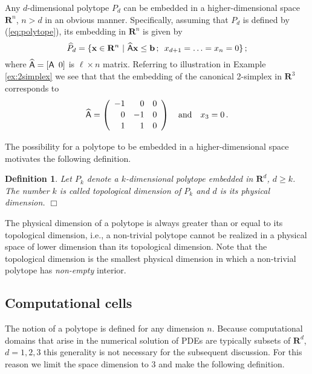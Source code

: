 \documentclass[pdf,12pt,relaxed]{SANDreport}
\newtheorem{defin}{Definition}
\begin{document}
       
     Any $d$-dimensional polytope $P_d$ can be embedded in a higher-dimensional space $\mathbf{R}^n$, $n>d$ in an obvious manner. Specifically, assuming that $P_d$ is defined by (\ref{eq:polytope}), its embedding in $\mathbf{R}^n$ is given by
    \begin{equation}\label{eq:polytope-ext}
    \widehat{P}_d = \{ {\bf x}\in{\mathbf R}^n\,\,|\,\, \widehat{\sf A}{\bf x} \le  {\bf b}\,;\,\,\,  x_{d+1} =\ldots=x_n = 0 \}\,;
    \end{equation}
    where $\widehat{\sf A} = \left[{\sf A} \,\,\, 0\right]$ is $\ell\times n$ matrix. Referring to illustration in Example \ref{ex:2simplex} we see that that the embedding of the canonical 2-simplex in $\mathbf{R}^3$ corresponds to 
    \begin{equation}\label{eq:exmat}
    \widehat{\sf A} = \left(\begin{array}{rrr} -1&0&0 \\[0.25ex] 0&-1&0\\[0.25ex] 1& 1&0 \end{array}\right)
    \quad\mbox{and}\quad x_3 = 0 \,.
    \end{equation}
    
    The possibility for a polytope to be embedded in a higher-dimensional space motivates the following definition.
      
    \begin{defin}\label{def:dim}
    Let $P_k$ denote a $k$-dimensional polytope embedded in $\mathbf{R}^d$, $d\ge k$. The number $k$ is called topological dimension of $P_k$ and $d$ is its physical dimension. \hfill$\Box$
    \end{defin}
    
    The physical dimension of a polytope is always greater than or equal to its topological dimension, i.e., a non-trivial polytope cannot be realized in a physical space of lower dimension than its topological dimension.
    Note that the topological dimension is the smallest physical dimension in which a non-trivial polytope has \emph{non-empty} interior.   
    \subsection{Computational cells}
The notion of a polytope is defined for any dimension $n$. Because computational domains that arise in the numerical solution of PDEs are typically subsets of $\mathbf{R}^d$, $d=1,2,3$ this generality is not necessary for the subsequent discussion. For this reason we limit the space dimension to 3 and make the following definition. 
   
\end{document}
